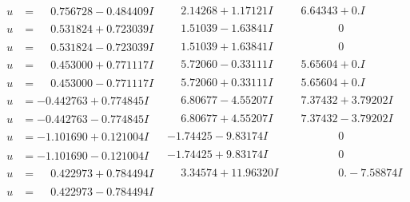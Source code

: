 \documentclass[1p]{elsarticle_modified}
\theoremstyle{definition}
\begin{document}
$$\begin{array}{c|c|c}
\begin{aligned}
u &= \phantom{-}0.756728 - 0.484409 I\end{aligned}
 & \phantom{-}2.14268 + 1.17121 I & \phantom{-}6.64343 + 0. I\phantom{ +0.000000I} \\ \hline\begin{aligned}
u &= \phantom{-}0.531824 + 0.723039 I\end{aligned}
 & \phantom{-}1.51039 - 1.63841 I & \phantom{-0.000000 } 0 \\ \hline\begin{aligned}
u &= \phantom{-}0.531824 - 0.723039 I\end{aligned}
 & \phantom{-}1.51039 + 1.63841 I & \phantom{-0.000000 } 0 \\ \hline\begin{aligned}
u &= \phantom{-}0.453000 + 0.771117 I\end{aligned}
 & \phantom{-}5.72060 - 0.33111 I & \phantom{-}5.65604 + 0. I\phantom{ +0.000000I} \\ \hline\begin{aligned}
u &= \phantom{-}0.453000 - 0.771117 I\end{aligned}
 & \phantom{-}5.72060 + 0.33111 I & \phantom{-}5.65604 + 0. I\phantom{ +0.000000I} \\ \hline\begin{aligned}
u &= -0.442763 + 0.774845 I\end{aligned}
 & \phantom{-}6.80677 - 4.55207 I & \phantom{-}7.37432 + 3.79202 I \\ \hline\begin{aligned}
u &= -0.442763 - 0.774845 I\end{aligned}
 & \phantom{-}6.80677 + 4.55207 I & \phantom{-}7.37432 - 3.79202 I \\ \hline\begin{aligned}
u &= -1.101690 + 0.121004 I\end{aligned}
 & -1.74425 - 9.83174 I & \phantom{-0.000000 } 0 \\ \hline\begin{aligned}
u &= -1.101690 - 0.121004 I\end{aligned}
 & -1.74425 + 9.83174 I & \phantom{-0.000000 } 0 \\ \hline\begin{aligned}
u &= \phantom{-}0.422973 + 0.784494 I\end{aligned}
 & \phantom{-}3.34574 + 11.96320 I & \phantom{-0.000000 } 0. - 7.58874 I \\ \hline\begin{aligned}
u &= \phantom{-}0.422973 - 0.784494 I\end{aligned}

\end{array}$$
\end{document}
